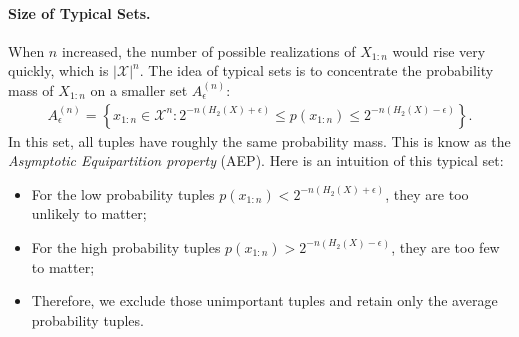 \documentclass{article}
\numberwithin{equation}{section}
\renewcommand{\cal}{\mathcal}
\theoremstyle{plain}
\theoremstyle{definition}
\begin{document}
\paragraph{Size of Typical Sets.}
When $n$ increased, the number of possible realizations of $X_{1:n}$ would rise very quickly, which is $\vert\cal{X}\vert^n$. The idea of typical sets is to concentrate the probability mass of $X_{1:n}$ on a smaller set $A_\epsilon^{(n)}$:
\begin{align*}
	A_\epsilon^{(n)}=\left\{x_{1:n}\in\cal{X}^n:2^{-n(H_2(X)+\epsilon)}\leq p(x_{1:n})\leq 2^{-n(H_2(X)-\epsilon)}\right\}.
\end{align*}
In this set, all tuples have roughly the same probability mass. This is know as the \textit{Asymptotic Equipartition property} (AEP). Here is an intuition of this typical set:
\begin{itemize}
	\item For the low probability tuples $p(x_{1:n})< 2^{-n(H_2(X)+\epsilon)}$, they are too unlikely to matter;
	\item For the high probability tuples $p(x_{1:n})> 2^{-n(H_2(X)-\epsilon)}$, they are too few to matter;
	\item Therefore, we exclude those unimportant tuples and retain only the average probability tuples.
\end{itemize}
\end{document}
